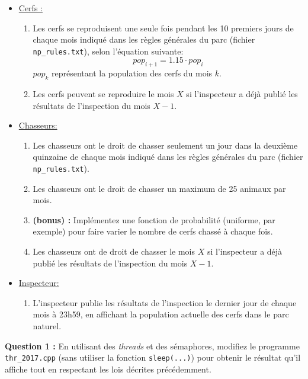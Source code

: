 \documentclass[CC,sansRappel,12pt]{tdtp-utf8}
\newcommand{\bare}[1]{\textcolor{blue}{#1}}
\newcommand{\puntos}[1]{\textcolor{red}{\bf [#1 puntos]}}
\begin{document}
\begin{feuille}
\begin{exercice}[Les threads et les sémaphores \bare{\puntos{7}}]
\begin{itemize}
\item \underline{Cerfs :}
\begin{enumerate}
\item Les cerfs se reproduisent une seule fois pendant les 10 premiers jours de chaque mois indiqué dans les règles générales du parc (fichier \texttt{np\_rules.txt}), selon l'équation suivante: $$pop_{i+1} = 1.15\cdot pop_{i}$$ $pop_k$  représentant la population des cerfs du mois $k$.
\item Les cerfs peuvent se reproduire le mois $X$ si l'inspecteur a déjà publié les résultats de l'inspection du mois $X-1$.
\end{enumerate}
\item \underline{Chasseurs:}
\begin{enumerate}
\item Les chasseurs ont le droit de chasser seulement un jour dans la deuxième quinzaine de chaque mois indiqué dans les règles générales du parc (fichier \texttt{np\_rules.txt}).
\item Les chasseurs ont le droit de chasser un maximum de 25 animaux par mois.
\item[] \textbf{(bonus) : } Implémentez une fonction de probabilité (uniforme, par exemple) pour faire varier le nombre de cerfs chassé à chaque fois.
\item Les chasseurs ont de droit de chasser le mois $X$ si l'inspecteur a déjà publié les résultats de l'inspection du mois $X-1$.
\end{enumerate}
\item \underline{Inspecteur:}
\begin{enumerate}
\item L'inspecteur publie les résultats de l'inspection le dernier jour de chaque mois à 23h59, en affichant la population actuelle des cerfs dans le parc naturel.
\end{enumerate}
\end{itemize}

\textbf{Question 1 : } {En utilisant des \textit{threads} et des sémaphores, modifiez le programme \texttt{thr\_2017.cpp} (sans utiliser la fonction \texttt{sleep(...)}) pour obtenir le résultat qu'il affiche tout en respectant les lois décrites précédemment.}


\end{exercice}
\end{feuille}
\end{document}
